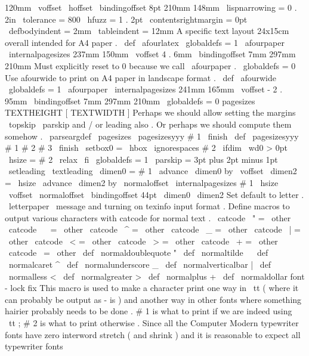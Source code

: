{{{{{}
{
120mm
}
%
{
\
voffset
}
{
\
hoffset
}
%
{
\
bindingoffset
}
{
8pt
}
%
{
210mm
}
{
148mm
}
%
%
\
lispnarrowing
=
0
.
2in
\
tolerance
=
800
\
hfuzz
=
1
.
2pt
\
contentsrightmargin
=
0pt
\
defbodyindent
=
2mm
\
tableindent
=
12mm
}
}
%
A
specific
text
layout
24x15cm
overall
intended
for
A4
paper
.
\
def
\
afourlatex
{
{
\
globaldefs
=
1
\
afourpaper
\
internalpagesizes
{
237mm
}
{
150mm
}
%
{
\
voffset
}
{
4
.
6mm
}
%
{
\
bindingoffset
}
{
7mm
}
%
{
297mm
}
{
210mm
}
%
%
%
Must
explicitly
reset
to
0
because
we
call
\
afourpaper
.
\
globaldefs
=
0
}
}
%
Use
afourwide
to
print
on
A4
paper
in
landscape
format
.
\
def
\
afourwide
{
{
\
globaldefs
=
1
\
afourpaper
\
internalpagesizes
{
241mm
}
{
165mm
}
%
{
\
voffset
}
{
-
2
.
95mm
}
%
{
\
bindingoffset
}
{
7mm
}
%
{
297mm
}
{
210mm
}
%
\
globaldefs
=
0
}
}
%
pagesizes
TEXTHEIGHT
[
TEXTWIDTH
]
%
Perhaps
we
should
allow
setting
the
margins
\
topskip
\
parskip
%
and
/
or
leading
also
.
Or
perhaps
we
should
compute
them
somehow
.
%
\
parseargdef
\
pagesizes
{
\
pagesizesyyy
#
1
\
finish
}
\
def
\
pagesizesyyy
#
1
#
2
#
3
\
finish
{
{
%
\
setbox0
=
\
hbox
{
\
ignorespaces
#
2
}
\
ifdim
\
wd0
>
0pt
\
hsize
=
#
2
\
relax
\
fi
\
globaldefs
=
1
%
\
parskip
=
3pt
plus
2pt
minus
1pt
\
setleading
{
\
textleading
}
%
%
\
dimen0
=
#
1
\
advance
\
dimen0
by
\
voffset
%
\
dimen2
=
\
hsize
\
advance
\
dimen2
by
\
normaloffset
%
\
internalpagesizes
{
#
1
}
{
\
hsize
}
%
{
\
voffset
}
{
\
normaloffset
}
%
{
\
bindingoffset
}
{
44pt
}
%
{
\
dimen0
}
{
\
dimen2
}
%
}
}
%
Set
default
to
letter
.
%
\
letterpaper
\
message
{
and
turning
on
texinfo
input
format
.
}
%
Define
macros
to
output
various
characters
with
catcode
for
normal
text
.
\
catcode
\
"
=
\
other
\
catcode
\
~
=
\
other
\
catcode
\
^
=
\
other
\
catcode
\
_
=
\
other
\
catcode
\
|
=
\
other
\
catcode
\
<
=
\
other
\
catcode
\
>
=
\
other
\
catcode
\
+
=
\
other
\
catcode
\
=
\
other
\
def
\
normaldoublequote
{
"
}
\
def
\
normaltilde
{
~
}
\
def
\
normalcaret
{
^
}
\
def
\
normalunderscore
{
_
}
\
def
\
normalverticalbar
{
|
}
\
def
\
normalless
{
<
}
\
def
\
normalgreater
{
>
}
\
def
\
normalplus
{
+
}
\
def
\
normaldollar
{
}
%
font
-
lock
fix
%
This
macro
is
used
to
make
a
character
print
one
way
in
\
tt
%
(
where
it
can
probably
be
output
as
-
is
)
and
another
way
in
other
fonts
%
where
something
hairier
probably
needs
to
be
done
.
%
%
#
1
is
what
to
print
if
we
are
indeed
using
\
tt
;
#
2
is
what
to
print
%
otherwise
.
Since
all
the
Computer
Modern
typewriter
fonts
have
zero
%
interword
stretch
(
and
shrink
)
and
it
is
reasonable
to
expect
all
%
typewriter
fonts
}}
